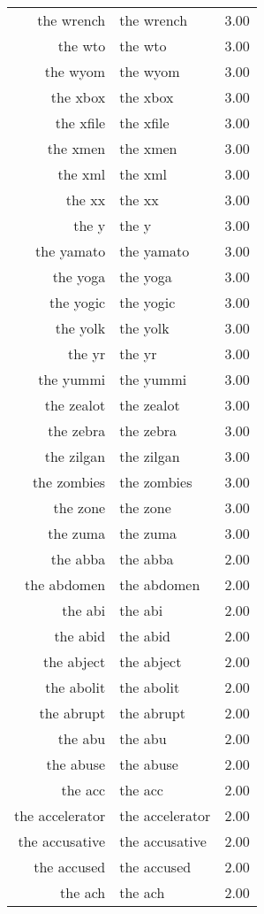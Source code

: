 \begin{table}[ht]
\begin{tabular}{rlr}
  the wrench & the wrench & 3.00 \\ 
  the wto & the wto & 3.00 \\ 
  the wyom & the wyom & 3.00 \\ 
  the xbox & the xbox & 3.00 \\ 
  the xfile & the xfile & 3.00 \\ 
  the xmen & the xmen & 3.00 \\ 
  the xml & the xml & 3.00 \\ 
  the xx & the xx & 3.00 \\ 
  the y & the y & 3.00 \\ 
  the yamato & the yamato & 3.00 \\ 
  the yoga & the yoga & 3.00 \\ 
  the yogic & the yogic & 3.00 \\ 
  the yolk & the yolk & 3.00 \\ 
  the yr & the yr & 3.00 \\ 
  the yummi & the yummi & 3.00 \\ 
  the zealot & the zealot & 3.00 \\ 
  the zebra & the zebra & 3.00 \\ 
  the zilgan & the zilgan & 3.00 \\ 
  the zombies & the zombies & 3.00 \\ 
  the zone & the zone & 3.00 \\ 
  the zuma & the zuma & 3.00 \\ 
  the abba & the abba & 2.00 \\ 
  the abdomen & the abdomen & 2.00 \\ 
  the abi & the abi & 2.00 \\ 
  the abid & the abid & 2.00 \\ 
  the abject & the abject & 2.00 \\ 
  the abolit & the abolit & 2.00 \\ 
  the abrupt & the abrupt & 2.00 \\ 
  the abu & the abu & 2.00 \\ 
  the abuse & the abuse & 2.00 \\ 
  the acc & the acc & 2.00 \\ 
  the accelerator & the accelerator & 2.00 \\ 
  the accusative & the accusative & 2.00 \\ 
  the accused & the accused & 2.00 \\ 
  the ach & the ach & 2.00 \\ 

\end{tabular}
\end{table}
